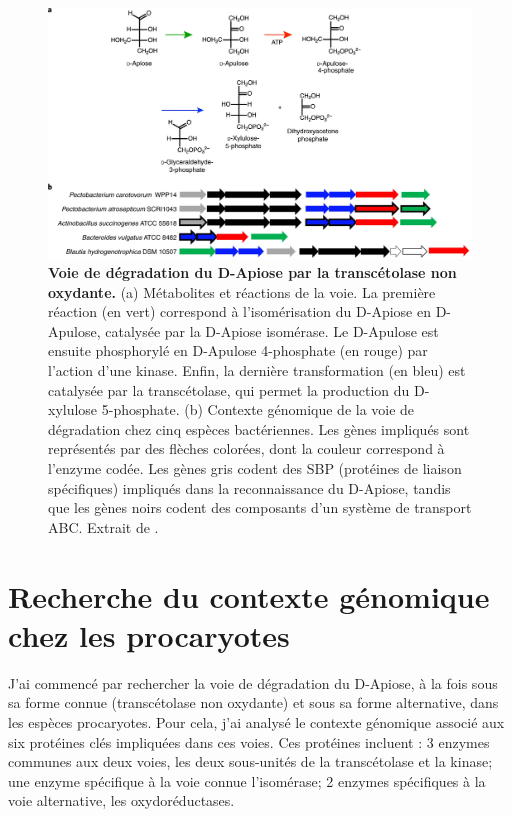 \begin{figure}[htbp]
    \centering
    \includegraphics[width=0.75\linewidth]{images/ApiosePathway.png}
    \caption[Voie de dégradation du D-Apiose par la transcétolase non oxydante]{\textbf{Voie de dégradation du D-Apiose par la transcétolase non oxydante.} (a) Métabolites et réactions de la voie. La première réaction (en vert) correspond à l'isomérisation du D-Apiose en D-Apulose, catalysée par la D-Apiose isomérase. Le D-Apulose est ensuite phosphorylé en D-Apulose 4-phosphate (en rouge) par l’action d’une kinase. Enfin, la dernière transformation (en bleu) est catalysée par la transcétolase, qui permet la production du D-xylulose 5-phosphate. (b) Contexte génomique de la voie de dégradation chez cinq espèces bactériennes. Les gènes impliqués sont représentés par des flèches colorées, dont la couleur correspond à l’enzyme codée. Les gènes gris codent des SBP (protéines de liaison spécifiques) impliqués dans la reconnaissance du D-Apiose, tandis que les gènes noirs codent des composants d’un système de transport ABC. Extrait de \cite{carter_functional_2018}.}
    \label{fig:apiosePathway}
\end{figure}

\section{Recherche du contexte génomique chez les procaryotes}

J'ai commencé par rechercher la voie de dégradation du D-Apiose, à la fois sous sa forme connue (transcétolase non oxydante) et sous sa forme alternative, dans les espèces procaryotes. Pour cela, j'ai analysé le contexte génomique associé aux six protéines clés impliquées dans ces voies. Ces protéines incluent : 3 enzymes communes aux deux voies, les deux sous-unités de la transcétolase et la kinase; une enzyme spécifique à la voie connue l'isomérase; 2 enzymes spécifiques à la voie alternative, les oxydoréductases.

